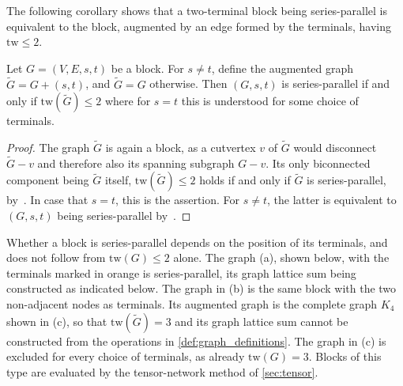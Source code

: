 \documentclass[]{amsart}
\numberwithin{mythm}{section}
\begin{document}
The following corollary shows that a two-terminal block being series-parallel is equivalent to the block, augmented by an edge formed by the terminals, having $\mathrm{tw}\le 2$. 
\begin{corollary}
\label{cor:sp_tw_equivalence}
Let $G=(V,E,s,t)$ be a block. For $s\neq t$, define the augmented graph $\tilde G=G+(s,t)$, and $\tilde G=G$ otherwise. Then $(G,s,t)$ is series-parallel if and only if $\mathrm{tw}(\tilde G)\le2$ where for $s=t$ this is understood for some choice of terminals.
\end{corollary}
\begin{proof}
The graph $\tilde G$ is again a block, as a cutvertex $v$ of $\tilde G$ would disconnect $\tilde G-v$ and therefore also its spanning subgraph $G-v$. Its only biconnected component being $\tilde G$ itself, $\mathrm{tw}(\tilde G)\le2$ holds if and only if $\tilde G$ is series-parallel, by~\cite[Thm.~42]{Bodlaender1998}. In case that $s=t$, this is the assertion. For $s\neq t$, the latter is equivalent to $(G,s,t)$ being series-parallel by~\cite[Cor.~3.4]{RoyleSokal2015}.
\end{proof}

\begin{remark}
Whether a block is series-parallel depends on the position of its terminals,
and does not follow from $\mathrm{tw}(G)\le 2$ alone. The graph (a), shown below, with the
terminals marked in orange is
series-parallel, its graph lattice sum being constructed as indicated below.
The graph in (b) is the same block with the two non-adjacent nodes as
terminals. Its augmented graph is the complete graph $K_4$ shown in (c), so
that $\mathrm{tw}(\tilde G)=3$ and its graph lattice sum cannot be constructed
from the operations in \cref{def:graph_definitions}. The graph in (c) is
excluded for every choice of terminals, as already $\mathrm{tw}(G)=3$. Blocks
of this type are evaluated by the tensor-network method of \cref{sec:tensor}.
\end{remark}
\end{document}
